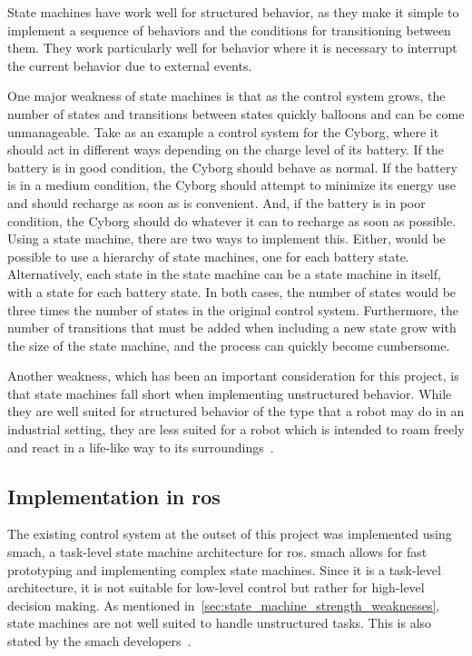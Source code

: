 \documentclass[\rootfolder/main.tex]{subfiles}
\begin{document}
State machines have work well for structured behavior, as they make it simple to implement a sequence of behaviors and the conditions for transitioning between them.
They work particularly well for behavior where it is necessary to interrupt the current behavior due to external events.

One major weakness of state machines is that as the control system grows, the number of states and transitions between states quickly balloons and can be come unmanageable.
Take as an example a control system for the Cyborg, where it should act in different ways depending on the charge level of its battery.
If the battery is in good condition, the Cyborg should behave as normal.
If the battery is in a medium condition, the Cyborg should attempt to minimize its energy use and should recharge as soon as is convenient.
And, if the battery is in poor condition, the Cyborg should do whatever it can to recharge as soon as possible.
Using a state machine, there are two ways to implement this.
Either, would be possible to use a hierarchy of state machines, one for each battery state.
Alternatively, each state in the state machine can be a state machine in itself, with a state for each battery state.
In both cases, the number of states would be three times the number of states in the original control system.
Furthermore, the number of transitions that must be added when including a new state grow with the size of the state machine, and the process can quickly become cumbersome.

Another weakness, which has been an important consideration for this project, is that state machines fall short when implementing unstructured behavior.
While they are well suited for structured behavior of the type that a robot may do in an industrial setting, they are less suited for a robot which is intended to roam freely and react in a life-like way to its surroundings~\cite{Millington2009}.


\subsection{Implementation in \acrshort{ros}}

The existing control system at the outset of this project was implemented using \acrshort{smach}, a task-level state machine architecture for \acrshort{ros}.
\acrshort{smach} allows for fast prototyping and implementing complex state machines.
Since it is a task-level architecture, it is not suitable for low-level control but rather for high-level decision making.
As mentioned in~\cref{sec:state_machine_strength_weaknesses}, state machines are not well suited to handle unstructured tasks.
This is also stated by the \acrshort{smach} developers~\cite{Bohren}.
\end{document}
